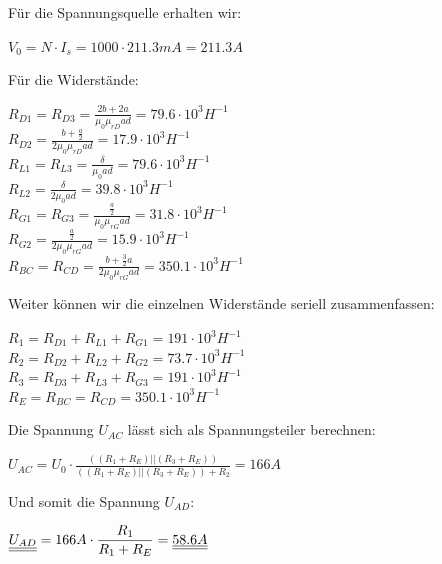 Für die Spannungsquelle erhalten wir:
\begin{center}

	$V_0 = N \cdot I_s = 1000 \cdot 211.3mA = 211.3A$ \\
\end{center}
Für die Widerstände:
\begin{center}
	$R_{D1} = R_{D3} = \frac{2b + 2a}{\mu_0 \mu_{rD} a d} = 79.6 \cdot 10^3H^{-1}$ \\
	$R_{D2} = \frac{b + \frac{a}{2} }{2 \mu_0 \mu_{rD} a d} = 17.9 \cdot 10^3H^{-1}$ \\

	$R_{L1} = R_{L3} = \frac{\delta}{\mu_0 a d} = 79.6 \cdot 10^3H^{-1}$ \\
	$R_{L2} =  \frac{\delta}{2\mu_0 a d} = 39.8 \cdot 10^3 H^{-1}$\\
	$R_{G1} = R_{G3} = \frac{\frac{a}{2}}{\mu_0\mu_{rG}ad} = 31.8 \cdot 10^3H^{-1}$ \\
	$R_{G2} =\frac{\frac{a}{2}}{2\mu_0\mu_{rG}ad} = 15.9 \cdot 10^3H^{-1}$ \\
	$R_{BC} = R_{CD} = \frac{b + \frac{3}{2}a}{2\mu_0\mu_{rG}ad} = 350.1\cdot 10^3H^{-1}$ \\
\end{center}
Weiter können wir die einzelnen Widerstände seriell zusammenfassen:
\begin{center}
	$R_1 = R_{D1} + R_{L1} + R_{G1} = 191 \cdot 10^3 H^{-1}$ \\
	$R_2 = R_{D2} + R_{L2} + R_{G2} = 73.7 \cdot 10^3 H^{-1}$ \\
	$R_3 = R_{D3} + R_{L3} + R_{G3} = 191 \cdot 10^3 H^{-1}$ \\
	$R_E = R_{BC} = R_ {CD} = 350.1 \cdot 10^3 H^{-1} $ \\
\end{center}

Die Spannung $U_{AC}$ lässt sich als Spannungsteiler berechnen:

\begin{center}
	$\displaystyle U_{AC} = U_0 \cdot \frac{((R_1 + R_E) || (R_3 + R_E)) } { ((R_1 + R_E) || (R_3 + R_E)) + R_2} = 166A$ \\
\end{center}
Und somit die Spannung $ U_{AD}$:
\begin{center}
	$\displaystyle \underline{\underline{U_{AD}}} = 166A \cdot \frac{R_1}{R_1 + R_E} = \underline{\underline{58.6A}}$
\end{center}
\iend

\newpage

